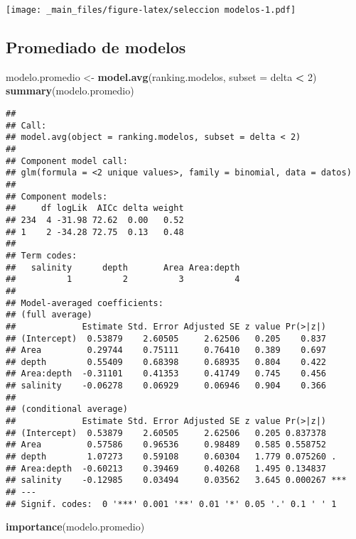 \documentclass[
]{book}
\newenvironment{Shaded}{\begin{snugshade}}{\end{snugshade}}
\newcommand{\DataTypeTok}[1]{\textcolor[rgb]{0.13,0.29,0.53}{#1}}
\newcommand{\DecValTok}[1]{\textcolor[rgb]{0.00,0.00,0.81}{#1}}
\newcommand{\KeywordTok}[1]{\textcolor[rgb]{0.13,0.29,0.53}{\textbf{#1}}}
\newcommand{\NormalTok}[1]{#1}
\newcommand{\OperatorTok}[1]{\textcolor[rgb]{0.81,0.36,0.00}{\textbf{#1}}}
\newcommand{\StringTok}[1]{\textcolor[rgb]{0.31,0.60,0.02}{#1}}
\begin{document}
\texttt{[image: \_main\_files/figure-latex/seleccion modelos-1.pdf]}

\hypertarget{promediado-de-modelos}{%
\subsection{Promediado de modelos}\label{promediado-de-modelos}}

\begin{Shaded}
\begin{Highlighting}[]
\NormalTok{modelo.promedio <-}\StringTok{ }\KeywordTok{model.avg}\NormalTok{(ranking.modelos, }\DataTypeTok{subset =}\NormalTok{ delta }\OperatorTok{<}\StringTok{ }\DecValTok{2}\NormalTok{)}
\KeywordTok{summary}\NormalTok{(modelo.promedio)}
\end{Highlighting}
\end{Shaded}

\begin{verbatim}
## 
## Call:
## model.avg(object = ranking.modelos, subset = delta < 2)
## 
## Component model call: 
## glm(formula = <2 unique values>, family = binomial, data = datos)
## 
## Component models: 
##     df logLik  AICc delta weight
## 234  4 -31.98 72.62  0.00   0.52
## 1    2 -34.28 72.75  0.13   0.48
## 
## Term codes: 
##   salinity      depth       Area Area:depth 
##          1          2          3          4 
## 
## Model-averaged coefficients:  
## (full average) 
##             Estimate Std. Error Adjusted SE z value Pr(>|z|)
## (Intercept)  0.53879    2.60505     2.62506   0.205    0.837
## Area         0.29744    0.75111     0.76410   0.389    0.697
## depth        0.55409    0.68398     0.68935   0.804    0.422
## Area:depth  -0.31101    0.41353     0.41749   0.745    0.456
## salinity    -0.06278    0.06929     0.06946   0.904    0.366
##  
## (conditional average) 
##             Estimate Std. Error Adjusted SE z value Pr(>|z|)    
## (Intercept)  0.53879    2.60505     2.62506   0.205 0.837378    
## Area         0.57586    0.96536     0.98489   0.585 0.558752    
## depth        1.07273    0.59108     0.60304   1.779 0.075260 .  
## Area:depth  -0.60213    0.39469     0.40268   1.495 0.134837    
## salinity    -0.12985    0.03494     0.03562   3.645 0.000267 ***
## ---
## Signif. codes:  0 '***' 0.001 '**' 0.01 '*' 0.05 '.' 0.1 ' ' 1
\end{verbatim}

\begin{Shaded}
\begin{Highlighting}[]
\KeywordTok{importance}\NormalTok{(modelo.promedio)}
\end{Highlighting}
\end{Shaded}
\end{document}
